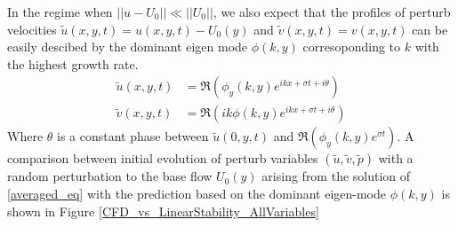 \documentclass[12pt]{report}   %
\begin{document}
In the regime when $||u-U_0|| \ll ||U_0||$, we also expect that the profiles of perturb velocities $\tilde{u}(x,y,t) = u(x,y,t) - U_0(y)$ and $\tilde{v}(x,y,t) = v(x,y,t)$ can be easily descibed by the dominant eigen mode $\phi(k,y)$ corresoponding to $k$ with the highest growth rate.
\begin{equation}
\begin{split}
 \tilde{u}(x,y,t) &= \Re\left(\phi_y(k,y) e^{ikx+\sigma t+ i\theta}\right)\\
 \tilde{v}(x,y,t) &= \Re\left(ik \phi(k,y) e^{ikx+\sigma t + i\theta }\right)
\end{split}
\end{equation}
Where $\theta$ is a constant phase between $\tilde{u}(0,y,t)$ and $\Re(\phi_y(k,y) e^{\sigma t})$. A comparison between initial evolution of perturb variables $(\tilde{u}, \tilde{v}, \tilde{p})$ with a random perturbation to the base flow $U_0(y)$ arising from the solution of \eqref{averaged_eq} with the prediction based  on the dominant eigen-mode $\phi(k,y)$ is shown in Figure \ref{CFD_vs_LinearStability_AllVariables}
\end{document}
